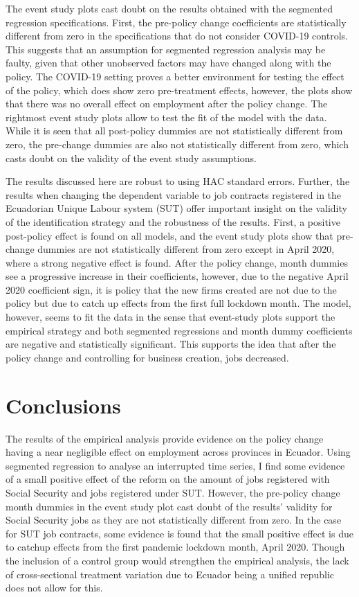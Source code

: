 \documentclass[11pt,a4paper]{article}\usepackage[]{graphicx}\usepackage[]{xcolor}
\begin{document}
The event study plots cast doubt on the results obtained with the segmented regression specifications. First, the pre-policy change coefficients are statistically different from zero in the specifications that do not consider COVID-19 controls. This suggests that an assumption for segmented regression analysis may be faulty, given that other unobserved factors may have changed along with the policy. The COVID-19 setting proves a better environment for testing the effect of the policy, which does show zero pre-treatment effects, however, the plots show that there was no overall effect on employment after the policy change. The rightmost event study plots allow to test the fit of the model with the data. While it is seen that all post-policy dummies are not statistically different from zero, the pre-change dummies are also not statistically different from zero, which casts doubt on the validity of the event study assumptions. 

The results discussed here are robust to using HAC standard errors. Further, the results when changing the dependent variable to job contracts registered in the Ecuadorian Unique Labour system (SUT) offer important insight on the validity of the identification strategy and the robustness of the results. First, a positive post-policy effect is found on all models, and the event study plots show that pre-change dummies are not statistically different from zero except in April 2020, where a strong negative effect is found. After the policy change, month dummies see a progressive increase in their coefficients, however, due to the negative April 2020 coefficient sign, it is policy that the new firms created are not due to the policy but due to catch up effects from the first full lockdown month. The model, however, seems to fit the data in the sense that event-study plots support the empirical strategy and both segmented regressions and month dummy coefficients are negative and statistically significant. This supports the idea that after the policy change and controlling for business creation, jobs decreased. 

\section{Conclusions}

The results of the empirical analysis provide evidence on the policy change having a near negligible effect on employment across provinces in Ecuador. Using segmented regression to analyse an interrupted time series, I find some evidence of a small positive effect of the reform on the amount of jobs registered with Social Security and jobs registered under SUT. However, the pre-policy change month dummies in the event study plot cast doubt of the results' validity for Social Security jobs as they are not statistically different from zero. In the case for SUT job contracts, some evidence is found that the small positive effect is due to catchup effects from the first pandemic lockdown month, April 2020. Though the inclusion of a control group would strengthen the empirical analysis, the lack of cross-sectional treatment variation due to Ecuador being a unified republic does not allow for this. 
\end{document}
